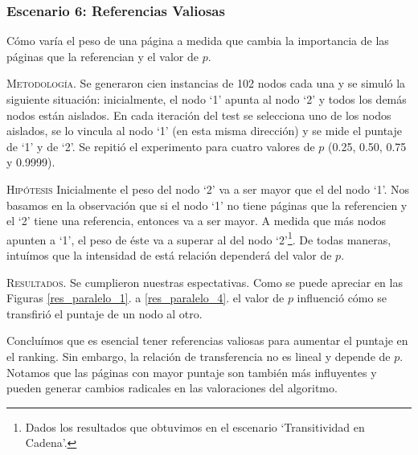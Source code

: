 \vspace{2em}
\subsubsection{Escenario 6: Referencias Valiosas} Cómo varía el peso de una página a medida que cambia la importancia de las páginas que la referencian y el valor de $p$.

\vspace{1em}
\noindent \textsc{Metodología}. Se generaron cien instancias de 102 nodos cada una y se simuló la siguiente situación: inicialmente, el nodo `1' apunta al nodo `2' y todos los demás nodos están aislados. En cada iteración del test se selecciona uno de los nodos aislados, se lo vincula al nodo `1' (en esta misma dirección) y se mide el puntaje de `1' y de `2'. Se repitió el experimento para cuatro valores de $p$ (0.25, 0.50, 0.75 y 0.9999).

\vspace{1em}

\vspace{1em}
\noindent \textsc{Hipótesis} Inicialmente el peso del nodo `2' va a ser mayor que el del nodo `1'. Nos basamos en la observación que si el nodo `1' no tiene páginas que la referencien y el `2' tiene una referencia, entonces va a ser mayor. A medida que más nodos apunten a `1', el peso de éste va a superar al del nodo `2'\footnote{Dados los resultados que obtuvimos en el escenario `Transitividad en Cadena'.}. De todas maneras, intuímos que la intensidad de está relación dependerá del valor de $p$.

\vspace{1em}
\noindent \textsc{Resultados}. Se cumplieron nuestras espectativas. Como se puede apreciar en las Figuras \ref{res_paralelo_1}. a  \ref{res_paralelo_4}. el valor de $p$ influenció cómo se transfirió el puntaje de un nodo al otro. 

Concluímos que es esencial tener referencias valiosas para aumentar el puntaje en el ranking. Sin embargo, la relación de transferencia no es lineal y depende de $p$. Notamos que las páginas con mayor puntaje son también más influyentes y pueden generar cambios radicales en las valoraciones del algoritmo.

\vspace{1em}


